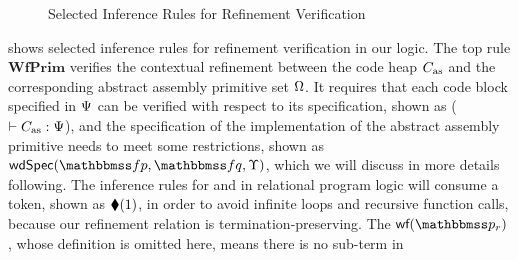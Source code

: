 \begin{figure*}[!t]
    \caption{Selected Inference Rules for Refinement Verification}
    \label{fig:Selected Inference Rules for Refinement Verification}
\end{figure*} 
\Fig{\ref{fig:Selected Inference Rules for Refinement Verification}} 
shows selected inference rules for refinement verification in our 
logic. The top rule $\textbf{WfPrim}$ verifies the contextual refinement 
between the code heap $C_{\text{as}}$ and the corresponding abstract assembly 
primitive set $\Omega$. It requires that each code block specified 
in $\Psi$ can be verified with respect to its specification, 
shown as ($\vdash {C_{\text{as}}} : {\Psi}$), and the specification 
of the implementation of the abstract assembly primitive needs 
to meet some restrictions, shown as $\wdSpec{\relspecpre}{\relspecpost}{\hprim}$, 
which we will discuss in more details following.
The inference rules for \jmp{} and \call{} in 
relational program logic will consume a token, 
shown as $\blacklozenge({1})$, in order to avoid 
infinite loops and recursive function calls, 
because our refinement relation is 
termination-preserving.
The $\wfFrm(\relastP_r)$, whose definition is omitted here,  
means there is no sub-term in 
